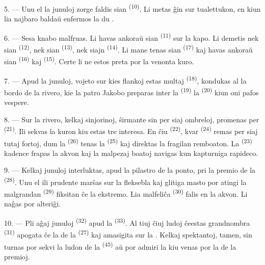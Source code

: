 5. --- Unu el la junuloj zorge faldis sian 
\textsuperscript{(10)}. Li metas ĝin sur tualettukon, en kiun lia najbaro
baldaŭ enfermos la du .

6. --- Sesa knabo malfruas. Li havas ankoraŭ sian 
\textsuperscript{(11)} sur la kapo. Li demetis nek sian 
\textsuperscript{(12)}, nek sian  \textsuperscript{(13)}, nek
siajn  \textsuperscript{(14)}. Li mane tenas sian
 \textsuperscript{(17)} kaj havas ankoraŭ sian
 \textsuperscript{(16)} kaj 
\textsuperscript{(15)}. Certe li ne estos preta por la venonta kuro.

7. --- Apud la junuloj, vojeto sur kies flankoj estas multaj 
\textsuperscript{(18)}, kondukas al la bordo de la rivero, kie la patro Jakobo
preparas inter la  \textsuperscript{(19)} la
 \textsuperscript{(20)} kiun oni pafos vespere.

\VUsaut{4.4mm}
\VUsaut{3.4mm}

8. --- Sur la rivero, kelkaj sinjorinoj, ŝirmante sin per siaj ombreloj,
promenas per  \textsuperscript{(21)}. Ili sekvas la kuron kiu
estas tre interesa. En ĉiu  \textsuperscript{(22)}, kvar
 \textsuperscript{(24)} remas per siaj tutaj fortoj, dum la
 \textsuperscript{(26)} tenas la 
\textsuperscript{(25)} kaj direktas la fragilan remboaton. La 
\textsuperscript{(23)} kadence frapas la akvon kaj la malpezaj boatoj navigas
kun kapturniga rapideco.

9. --- Kelkaj junuloj interluktas, apud la pilastro de la ponto, pri la premio
de la  \textsuperscript{(28)}. Unu el ili prudente marŝas
sur la fleksebla kaj glitiga masto por atingi la malgrandan 
\textsuperscript{(29)} fiksitan ĉe la ekstremo. Lia malfeliĉa
 \textsuperscript{(30)} falis en la akvon. Li naĝas por
alteriĝi.

10. --- Pli aĝaj junuloj  \textsuperscript{(32)} apud
la  \textsuperscript{(33)}. Al tiuj ĉiuj ludoj ĉeestas
grandnombra  \textsuperscript{(31)} apogata ĉe la
 de la  \textsuperscript{(27)} kaj amasigita
sur la . Kelkaj spektantoj, tamen, sin turnas por sekvi la ludon
de la  \textsuperscript{(45)} aŭ por admiri la
 kiu venas por la  de la premioj.

